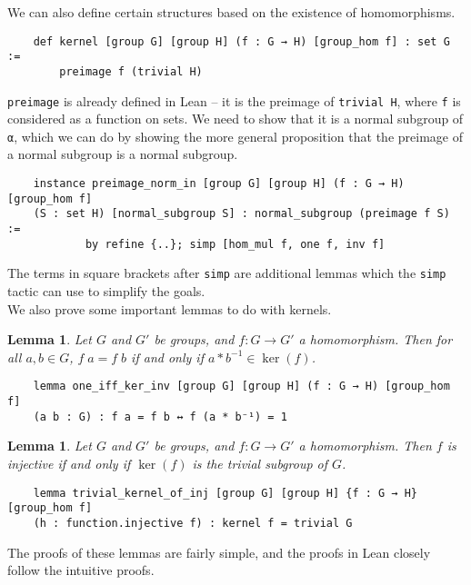 \documentclass[runningheads,a4paper]{llncs}
\renewcommand{\-}{\setminus}
\newtheorem{lemma}[theorem]{Lemma}
\begin{document}
We can also define certain structures based on the existence of homomorphisms.

\begin{lstlisting}
    def kernel [group G] [group H] (f : G → H) [group_hom f] : set G := 
        preimage f (trivial H)
\end{lstlisting}

\lstinline{preimage} is already defined in Lean -- it is the preimage of \lstinline{trivial H}, where \lstinline{f} is considered as a function on sets. We need to show that it is a normal subgroup of \lstinline{α}, which we can do by showing the more general proposition that the preimage of a normal subgroup is a normal subgroup.

\begin{lstlisting}
    instance preimage_norm_in [group G] [group H] (f : G → H) [group_hom f]
    (S : set H) [normal_subgroup S] : normal_subgroup (preimage f S) :=
            by refine {..}; simp [hom_mul f, one f, inv f]
\end{lstlisting}

The terms in square brackets after \lstinline{simp} are additional lemmas which the \lstinline{simp} tactic can use to simplify the goals.\\

We also prove some important lemmas to do with kernels.

\begin{lemma}
Let $G$ and $G'$ be groups, and $f: G \to G'$ a homomorphism. Then for all $a,b \in G$, $f\; a = f\; b$ if and only if $a * b^{-1} \in \ker (f)$.
\end{lemma}

\begin{lstlisting}
    lemma one_iff_ker_inv [group G] [group H] (f : G → H) [group_hom f] 
    (a b : G) : f a = f b ↔ f (a * b⁻¹) = 1
\end{lstlisting}

\begin{lemma}
Let $G$ and $G'$ be groups, and $f: G \to G'$ a homomorphism. Then $f$ is injective if and only if $\ker (f)$ is the trivial subgroup of $G$. 
\end{lemma}

\begin{lstlisting}
    lemma trivial_kernel_of_inj [group G] [group H] {f : G → H} [group_hom f] 
    (h : function.injective f) : kernel f = trivial G 
\end{lstlisting}

The proofs of these lemmas are fairly simple, and the proofs in Lean closely follow the intuitive proofs.
\end{document}
